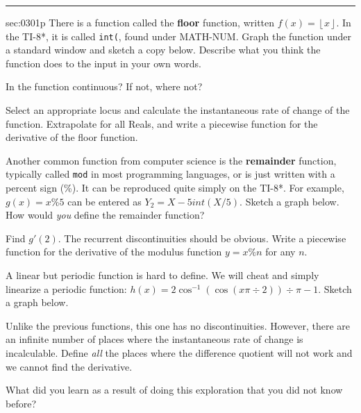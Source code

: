 \renewcommand{\columnseprule}{1.5pt}
\begin{multicols*}{2}
\rule[0.4\baselineskip]{0.4\textwidth}{1pt}
\noindent
{}\label{sec:0301p}
\begin{exercises}{sec:0301p}
\lab{} There is a function called the \textbf{floor} function, written
$f(x)=\left\lfloor x \right\rfloor$.  In the TI-8*, it is called \texttt{int(},
found under MATH-NUM.  Graph the function under a standard 
window and sketch a copy below.  Describe what you
think the function does to the input in your own words.

\vspace{3cm}
\lab{}  In the function continuous?  If not, where not?  

\vspace{3cm}
\lab{} Select an appropriate locus and calculate the instantaneous rate of change
of the function.  Extrapolate for all Reals, and write a piecewise function
for the derivative of the floor function.

\vspace{3cm}
\lab{} Another common function from computer science is the \textbf{remainder}
function, typically called \texttt{mod} in most programming languages, or is just written with
a percent sign (\%).  It can be reproduced quite simply on the TI-8*.  For example,
$g(x)=x\%5$ can be entered as $Y_2=X-5int(X/5)$.  Sketch a graph below.
How would \emph{you} define the remainder function?  

\vspace{4cm}
\lab{} Find $g'(2)$.  The recurrent discontinuities should be obvious.  Write
a piecewise function for the derivative of the modulus function $y=x\%n$
for any $n$.

\vspace{4cm}
\lab{} A linear but periodic function is hard to define.  We will cheat and simply
linearize a periodic function: $h(x)=2\cos^{-1}(\cos(x\pi\div2))\div\pi-1$.%
Sketch a graph below.

\vspace{4cm}
\lab{} Unlike the previous functions, this one has no discontinuities.  However,
there are an infinite number of places where the instantaneous rate of change
is incalculable.  Define \emph{all} the places where the difference quotient will not
work and we cannot find the derivative.

\vspace{3cm}
\lab{} What did you learn as a result of doing this exploration that you did not
know before?
\end{exercises}	
\end{multicols*}